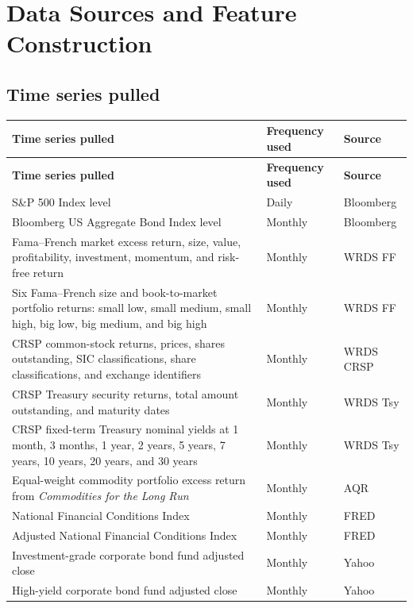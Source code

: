 \section{Data Sources and Feature Construction}
\label{app:data-transformations}
\label{app:features}

\subsection{Time series pulled}

\begin{longtable}{>{\raggedright\arraybackslash}p{}>{\raggedright\arraybackslash}p{}>{\raggedright\arraybackslash}p{}}
\toprule
\textbf{Time series pulled} & \textbf{Frequency used} & \textbf{Source} \\
\midrule
\endfirsthead
\toprule
\textbf{Time series pulled} & \textbf{Frequency used} & \textbf{Source} \\
\midrule
\endhead
S\&P 500 Index level & Daily & Bloomberg \\
Bloomberg US Aggregate Bond Index level & Monthly & Bloomberg \\
Fama--French market excess return, size, value, profitability, investment, momentum, and risk-free return & Monthly & WRDS FF \\
Six Fama--French size and book-to-market portfolio returns: small low, small medium, small high, big low, big medium, and big high & Monthly & WRDS FF \\
CRSP common-stock returns, prices, shares outstanding, SIC classifications, share classifications, and exchange identifiers & Monthly & WRDS CRSP \\
CRSP Treasury security returns, total amount outstanding, and maturity dates & Monthly & WRDS Tsy \\
CRSP fixed-term Treasury nominal yields at 1 month, 3 months, 1 year, 2 years, 5 years, 7 years, 10 years, 20 years, and 30 years & Monthly & WRDS Tsy \\
Equal-weight commodity portfolio excess return from \textit{Commodities for the Long Run} & Monthly & AQR \\
National Financial Conditions Index & Monthly & FRED \\
Adjusted National Financial Conditions Index & Monthly & FRED \\
Investment-grade corporate bond fund adjusted close & Monthly & Yahoo \\
High-yield corporate bond fund adjusted close & Monthly & Yahoo \\

\end{longtable}
